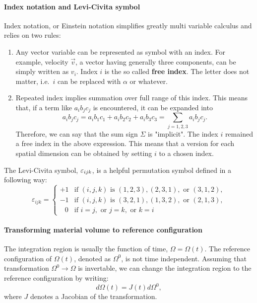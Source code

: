 \documentclass[justified, nobib,a4paper]{tufte-handout}
\begin{document}
\paragraph{Index notation and Levi-Civita symbol}
Index notation, or Einstein notation simplifies greatly multi variable 
calculus and relies on two rules:
\begin{enumerate}
  \item Any vector variable can be represented as symbol with an index.
    For example, velocity \(\vec{v}\), a vector having generally three 
    components, can be simply written as \(v_i\). Index \(i\) is the so 
    called \textbf{free index}. The letter does not matter, i.e.\ \(i\) can
    be replaced with \(\alpha\) or whatever.
  \item Repeated index implies summation over full range of this index. 
    This means that, if a term like \(a_i b_j c_j\) is encountered, it can
    be expanded into
    \[
      a_i b_j c_j = a_i b_1 c_1 + a_i b_2 c_2 + a_i b_3 c_3 =
      \sum\limits_{j=1,2,3} a_i b_j c_j.
    \]
    Therefore, we can say that the sum sign \(\Sigma\) is "implicit". The index
    \(i\) remained a free index in the above expression. This means that a
    version for each spatial dimension can be obtained by setting \(i\) to 
    a chosen index.
\end{enumerate}
The Levi-Civita symbol, \(\varepsilon_{{i}{j}{k}}\), is a helpful permutation
symbol defined in a following way:
\begin{equation*}
\varepsilon_{ijk} = \begin{cases}
         +1 & \text{if } (i,j,k) \text{ is } (1,2,3), (2,3,1), \text{ or } (3,1,2), \\
         -1 & \text{if } (i,j,k) \text{ is } (3,2,1), (1,3,2), \text{ or } (2,1,3), \\
    \;\;\,0 & \text{if } i = j, \text{ or } j = k, \text{ or } k = i
\end{cases}
\end{equation*}

\paragraph{Transforming material volume to reference configuration}
The integration region is usually the function of time, \(\Omega = \Omega(t)\).
The reference configuration of \(\Omega(t)\), denoted as \(\Omega^0\), is not 
time independent. Assuming that transformation \(\Omega^0 \rightarrow \Omega\)
is invertable, we can change the integration region to the reference
configuration by writing:
\begin{equation}
  d\Omega(t) = J(t)d\Omega^0,
  \label{eq::jacobian_relation}
\end{equation}
where \(J\) denotes a Jacobian of the transformation.
\end{document}
